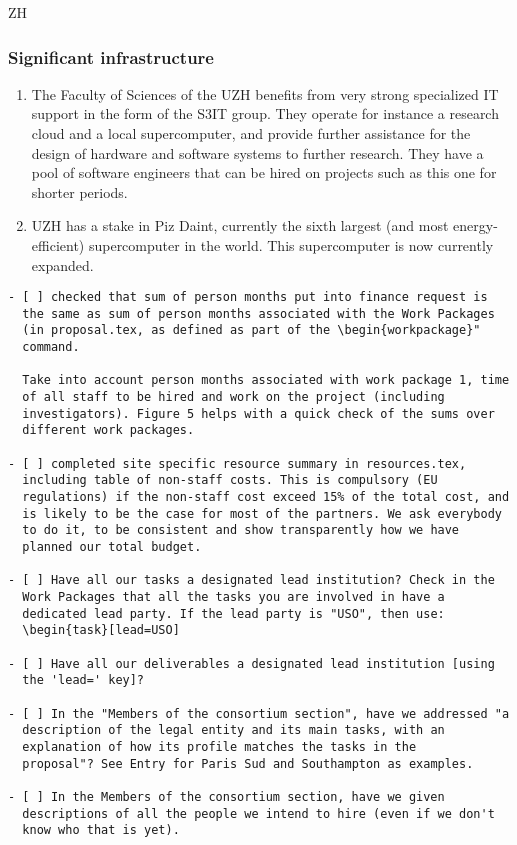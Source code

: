 \begin{sitedescription}{ZH}
\subsubsection*{Significant infrastructure}
\begin{enumerate}
\item The Faculty of Sciences of the UZH benefits from very strong specialized IT support in the form of the S3IT group. They operate for instance a research cloud and a local supercomputer,  and provide further assistance for the design of hardware and software systems to further research. They have a pool of software engineers that can be hired on projects such as this one for shorter periods.
\item UZH has a stake in Piz Daint, currently the sixth largest (and most energy-efficient) supercomputer in the world. This supercomputer is now currently expanded. 
\end{enumerate}
\end{sitedescription}


\begin{draft}
\vspace{1cm}

\begin{verbatim}
- [ ] checked that sum of person months put into finance request is
  the same as sum of person months associated with the Work Packages
  (in proposal.tex, as defined as part of the \begin{workpackage}"
  command.
  
  Take into account person months associated with work package 1, time
  of all staff to be hired and work on the project (including
  investigators). Figure 5 helps with a quick check of the sums over
  different work packages.

- [ ] completed site specific resource summary in resources.tex,
  including table of non-staff costs. This is compulsory (EU
  regulations) if the non-staff cost exceed 15% of the total cost, and
  is likely to be the case for most of the partners. We ask everybody
  to do it, to be consistent and show transparently how we have
  planned our total budget.

- [ ] Have all our tasks a designated lead institution? Check in the
  Work Packages that all the tasks you are involved in have a
  dedicated lead party. If the lead party is "USO", then use:
  \begin{task}[lead=USO]

- [ ] Have all our deliverables a designated lead institution [using
  the 'lead=' key]?

- [ ] In the "Members of the consortium section", have we addressed "a
  description of the legal entity and its main tasks, with an
  explanation of how its profile matches the tasks in the
  proposal"? See Entry for Paris Sud and Southampton as examples.

- [ ] In the Members of the consortium section, have we given
  descriptions of all the people we intend to hire (even if we don't
  know who that is yet). 
\end{verbatim}
\end{draft}

